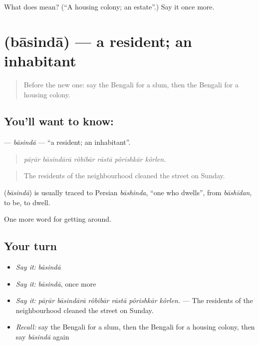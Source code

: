 \begin{tcolorbox}[breakable,colback=teal!4,colframe=teal!35!black,title={Before you move on}]
What does  mean? (\textquotedblleft{}A housing colony; an estate\textquotedblright{}.) Say it once more.
\end{tcolorbox}
\section[\texorpdfstring{\bn{বাসিন্দা} (bāsindā)}{বাসিন্দা (bāsindā)}]{ (bāsindā) — a resident; an inhabitant}

\label{lesson:BN-C409-basinda}



\begin{quote}
Before the new one: say the Bengali for a slum, then the Bengali for a housing colony.
\end{quote}

\subsection*{You'll want to know: }
\textbf{} — \emph{bāsindā} — \textquotedblleft{}a resident; an inhabitant\textquotedblright{}.

\begin{quote}
     
\end{quote}

\begin{quote}
\emph{pāṛār bāsindārā rôbibār rāstā pôrishkār kôrlen.}
\end{quote}

\begin{quote}
The residents of the neighbourhood cleaned the street on Sunday.
\end{quote}

\begin{cousinweb}
\textbf{} (\emph{bāsindā}) is usually traced to Persian \emph{bāshinda}, \textquotedblleft{}one who dwells\textquotedblright{}, from \emph{bāshīdan}, to be, to dwell.
\end{cousinweb}

\begin{grammarlens}[title={What you've built}]
One more word for getting around.
\end{grammarlens}

\subsection*{Your turn}
\begin{itemize}
\raggedright
  \item \emph{Say it:} \emph{bāsindā}
  \item \emph{Say it:} \emph{bāsindā}, once more
  \item \emph{Say it:} \emph{pāṛār bāsindārā rôbibār rāstā pôrishkār kôrlen.} — The residents of the neighbourhood cleaned the street on Sunday.
  \item \emph{Recall:} say the Bengali for a slum, then the Bengali for a housing colony, then say \emph{bāsindā} again
\end{itemize}

